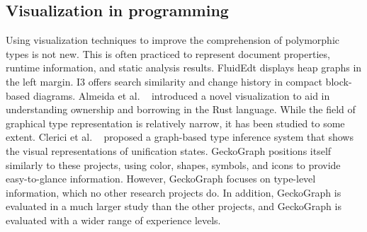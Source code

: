 \documentclass[preprint,12pt]{elsarticle}
\begin{document}


\subsection{Visualization in programming}
Using visualization techniques to improve the comprehension of polymorphic types is not new. This is often practiced to represent document properties, runtime information, and static analysis results.  FluidEdt \cite{Ou2015-vr} displays heap graphs in the left margin. I3 \cite{Beck2015-my} offers search similarity and change history in compact block-based diagrams. Almeida et al. ~\cite{Almeida2022-bv} introduced a novel visualization to aid in understanding ownership and borrowing in the Rust language. While the field of graphical type representation is relatively narrow, it has been studied to some extent. Clerici et al. ~\cite{Clerici2013-ru} proposed a graph-based type inference system that shows the visual representations of unification states. GeckoGraph positions itself similarly to these projects, using color, shapes, symbols, and icons to provide easy-to-glance information. However, GeckoGraph focuses on type-level information, which no other research projects do. In addition, GeckoGraph is evaluated in a much larger study than the other projects, and GeckoGraph is evaluated with a wider range of experience levels. 
\end{document}
